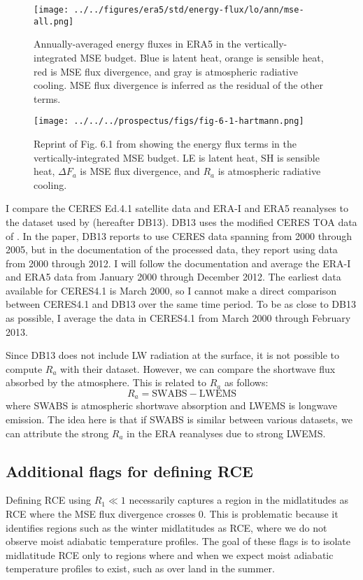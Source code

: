 \documentclass[11pt]{article}
\begin{document}
\begin{figure}[htbp]
\centering
\texttt{[image: ../../figures/era5/std/energy-flux/lo/ann/mse-all.png]}
\caption{\label{fig:org076a73b}Annually-averaged energy fluxes in ERA5 in the vertically-integrated MSE budget. Blue is latent heat, orange is sensible heat, red is MSE flux divergence, and gray is atmospheric radiative cooling. MSE flux divergence is inferred as the residual of the other terms.}
\end{figure}

\begin{figure}[htbp]
\centering
\texttt{[image: ../../../prospectus/figs/fig-6-1-hartmann.png]}
\caption{\label{fig:org719411c}Reprint of Fig. 6.1 from \cite{hartmann_global_2016} showing the energy flux terms in the vertically-integrated MSE budget. LE is latent heat, SH is sensible heat, \(\Delta F_a\) is MSE flux divergence, and \(R_a\) is atmospheric radiative cooling.}
\end{figure}

I compare the CERES Ed.4.1 satellite data and ERA-I and ERA5 reanalyses to the dataset used by \cite{donohoe_seasonal_2013} (hereafter DB13). DB13 uses the modified CERES TOA data of \cite{fasullo_annual_2008}. In the paper, DB13 reports to use CERES data spanning from 2000 through 2005, but in the documentation of the processed data, they report using data from 2000 through 2012. I will follow the documentation and average the ERA-I and ERA5 data from January 2000 through December 2012. The earliest data available for CERES4.1 is March 2000, so I cannot make a direct comparison between CERES4.1 and DB13 over the same time period. To be as close to DB13 as possible, I average the data in CERES4.1 from March 2000 through February 2013.

Since DB13 does not include LW radiation at the surface, it is not possible to compute \(R_a\) with their dataset. However, we can compare the shortwave flux absorbed by the atmosphere. This is related to \(R_a\) as follows:
\begin{equation}
R_a = \mathrm{SWABS} - \mathrm{LWEMS}
\end{equation}
where SWABS is atmospheric shortwave absorption and LWEMS is longwave emission. The idea here is that if SWABS is similar between various datasets, we can attribute the strong \(R_a\) in the ERA reanalyses due to strong LWEMS.

\subsection{Additional flags for defining RCE}
\label{sec:org1637c9e}
Defining RCE using \(R_1 \ll 1\) necessarily captures a region in the midlatitudes as RCE where the MSE flux divergence crosses 0. This is problematic because it identifies regions such as the winter midlatitudes as RCE, where we do not observe moist adiabatic temperature profiles. The goal of these flags is to isolate midlatitude RCE only to regions where and when we expect moist adiabatic temperature profiles to exist, such as over land in the summer.
\end{document}
